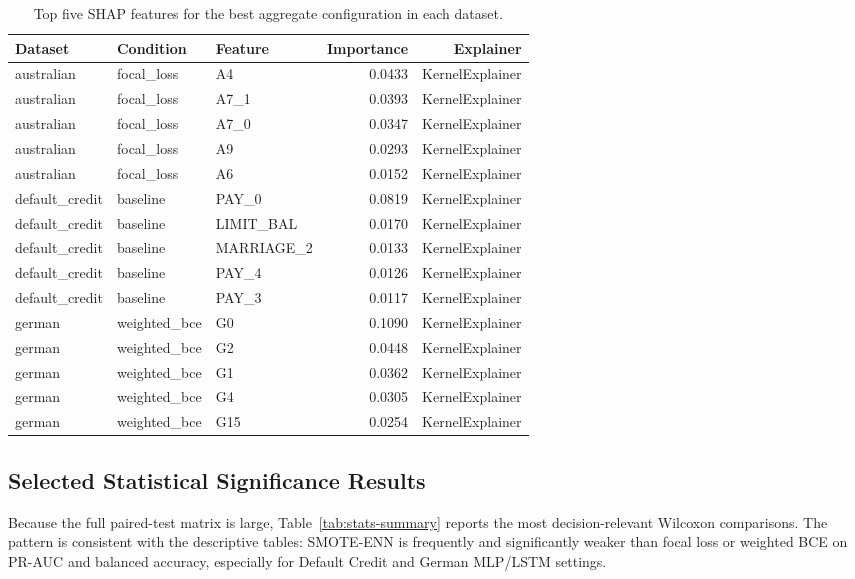 \documentclass[11pt,a4paper]{article}
\begin{document}
\begin{table}[htbp]
\centering
\small
\caption{Top five SHAP features for the best aggregate configuration in each dataset.}
\label{tab:shap-summary}
\begin{tabular}{lllrr}
\toprule
Dataset & Condition & Feature & Importance & Explainer \\
\midrule
australian & focal\_loss & A4 & 0.0433 & KernelExplainer \\
australian & focal\_loss & A7\_1 & 0.0393 & KernelExplainer \\
australian & focal\_loss & A7\_0 & 0.0347 & KernelExplainer \\
australian & focal\_loss & A9 & 0.0293 & KernelExplainer \\
australian & focal\_loss & A6 & 0.0152 & KernelExplainer \\
default\_credit & baseline & PAY\_0 & 0.0819 & KernelExplainer \\
default\_credit & baseline & LIMIT\_BAL & 0.0170 & KernelExplainer \\
default\_credit & baseline & MARRIAGE\_2 & 0.0133 & KernelExplainer \\
default\_credit & baseline & PAY\_4 & 0.0126 & KernelExplainer \\
default\_credit & baseline & PAY\_3 & 0.0117 & KernelExplainer \\
german & weighted\_bce & G0 & 0.1090 & KernelExplainer \\
german & weighted\_bce & G2 & 0.0448 & KernelExplainer \\
german & weighted\_bce & G1 & 0.0362 & KernelExplainer \\
german & weighted\_bce & G4 & 0.0305 & KernelExplainer \\
german & weighted\_bce & G15 & 0.0254 & KernelExplainer \\
\bottomrule
\end{tabular}
\end{table}

\subsection*{Selected Statistical Significance Results}
Because the full paired-test matrix is large, Table~\ref{tab:stats-summary} reports the most decision-relevant Wilcoxon comparisons. The pattern is consistent with the descriptive tables: SMOTE-ENN is frequently and significantly weaker than focal loss or weighted BCE on PR-AUC and balanced accuracy, especially for Default Credit and German MLP/LSTM settings.
\end{document}
